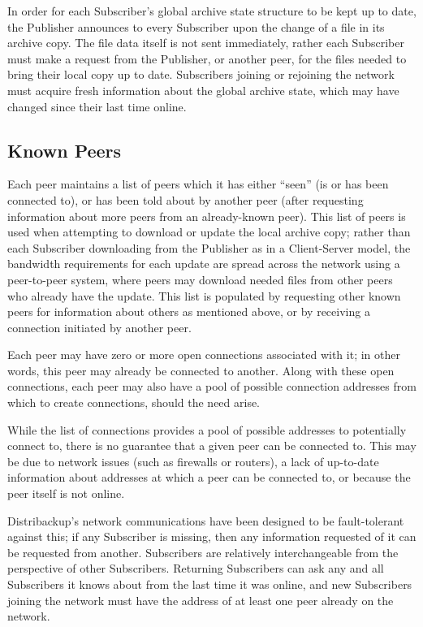 \documentclass[12pt,a4paper,]{adreport}
\begin{document}
In order for each Subscriber's global archive state structure to be kept
up to date, the Publisher announces to every Subscriber upon the change
of a file in its archive copy. The file data itself is not sent
immediately, rather each Subscriber must make a request from the
Publisher, or another peer, for the files needed to bring their local
copy up to date. Subscribers joining or rejoining the network must
acquire fresh information about the global archive state, which may have
changed since their last time online.

\subsection{Known Peers}\label{known-peers}

Each peer maintains a list of peers which it has either ``seen'' (is or
has been connected to), or has been told about by another peer (after
requesting information about more peers from an already-known peer).
This list of peers is used when attempting to download or update the
local archive copy; rather than each Subscriber downloading from the
Publisher as in a Client-Server model, the bandwidth requirements for
each update are spread across the network using a peer-to-peer system,
where peers may download needed files from other peers who already have
the update. This list is populated by requesting other known peers for
information about others as mentioned above, or by receiving a
connection initiated by another peer.

Each peer may have zero or more open connections associated with it; in
other words, this peer may already be connected to another. Along with
these open connections, each peer may also have a pool of possible
connection addresses from which to create connections, should the need
arise.

While the list of connections provides a pool of possible addresses to
potentially connect to, there is no guarantee that a given peer can be
connected to. This may be due to network issues (such as firewalls or
routers), a lack of up-to-date information about addresses at which a
peer can be connected to, or because the peer itself is not online.

Distribackup's network communications have been designed to be
fault-tolerant against this; if any Subscriber is missing, then any
information requested of it can be requested from another. Subscribers
are relatively interchangeable from the perspective of other
Subscribers. Returning Subscribers can ask any and all Subscribers it
knows about from the last time it was online, and new Subscribers
joining the network must have the address of at least one peer already
on the network.
\end{document}

